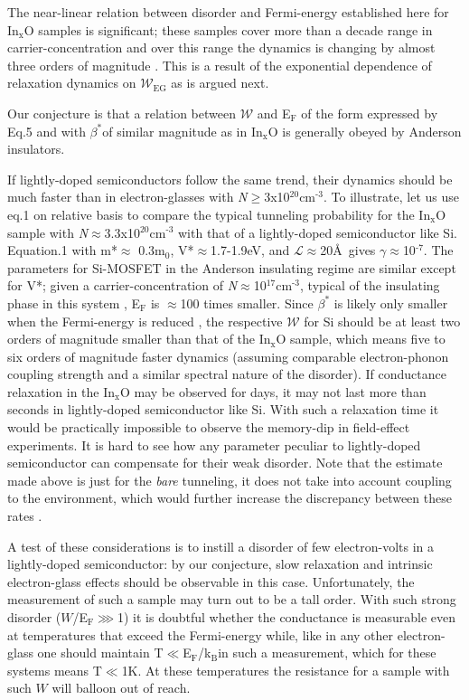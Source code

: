 \documentclass
[preprint,showpacs,byrevtex,10pt,twocolumn,tightenlines,prl,letterpaper]{revtex4}%
\begin{document}
The near-linear relation between disorder and Fermi-energy established here
for In$_{\text{x}}$O samples is significant; these samples cover more than a
decade range in carrier-concentration and over this range the dynamics is
changing by almost three orders of magnitude \cite{23}. This is a result of
the exponential dependence of relaxation dynamics on $\mathcal{W}_{\text{EG}}$
as is argued next.

Our conjecture is that a relation between $\mathcal{W}$ and E$_{\text{F}}$ of
the form expressed by Eq.5 and with $\beta^{\ast}$of similar magnitude as in
In$_{\text{x}}$O is generally obeyed by Anderson insulators.

If lightly-doped semiconductors follow the same trend, their dynamics should
be much faster than in electron-glasses with \textit{N}$\geq$3x10$^{\text{20}%
}$cm$^{\text{-3}}$. To illustrate, let us use eq.1 on relative basis to
compare the typical tunneling probability for the In$_{\text{x}}$O sample with
\textit{N}$\approx$3.3x10$^{\text{20}}$cm$^{\text{-3}}$ with that of a
lightly-doped semiconductor like Si. Equation.1 with m*$\approx$%
0.3m$_{\text{0}}$, V*$\approx$1.7-1.9eV, and $\mathcal{L}\approx$20\AA \ gives
$\gamma\approx$10$^{\text{-7}}$. The parameters for Si-MOSFET in the Anderson
insulating regime \cite{60} are similar except for V*; given a
carrier-concentration of \textit{N}$\approx$10$^{\text{17}}$cm$^{\text{-3}}$,
typical of the insulating phase in this system \cite{60}, E$_{\text{F}}$ is
$\approx$100 times smaller. Since $\beta^{\ast}$ is likely only smaller when
the Fermi-energy is reduced \cite{48}, the respective $\mathcal{W}$ for Si
should be at least two orders of magnitude smaller than that of the
In$_{\text{x}}$O sample, which means five to six orders of magnitude faster
dynamics (assuming comparable electron-phonon coupling strength and a similar
spectral nature of the disorder). If conductance relaxation in the
In$_{\text{x}}$O may be observed for days, it may not last more than seconds
in lightly-doped semiconductor like Si. With such a relaxation time it would
be practically impossible to observe the memory-dip in field-effect
experiments. It is hard to see how any parameter peculiar to lightly-doped
semiconductor can compensate for their weak disorder. Note that the estimate
made above is just for the \textit{bare} tunneling, it does not take into
account coupling to the environment, which would further increase the
discrepancy between these rates \cite{27}.

A test of these considerations is to instill a disorder of few electron-volts
in a lightly-doped semiconductor: by our conjecture, slow relaxation and
intrinsic electron-glass effects should be observable in this case.
Unfortunately, the measurement of such a sample may turn out to be a tall
order. With such strong disorder ($W$/E$_{\text{F}}\ggg$1) it is doubtful
whether the conductance is measurable even at temperatures that exceed the
Fermi-energy while, like in any other electron-glass one should maintain
T$\ll$E$_{\text{F}}$/k$_{\text{B}}$in such a measurement, which for these
systems means T$\ll$1K. At these temperatures the resistance for a sample with
such $W$ will balloon out of reach.
\end{document}
